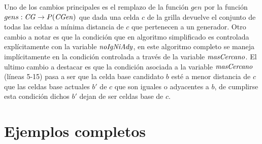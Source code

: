 \newpage
Uno de los cambios principales es el remplazo de la función $gen$ por la
función $gens : \mathit{CG} \rightarrow P(\mathit{CGen})$ que dada una celda $c$ de
la grilla devuelve el conjunto de todas las celdas a mínima distancia de $c$ que pertenecen a
un generador. Otro cambio a notar es que la condición que en algoritmo
simplificado es controlada explícitamente con la variable $\mathit{noIgNiAdy}$, en
este algoritmo completo se maneja implícitamente en la condición controlada
a través de la variable $\mathit{masCercano}$. El ultimo cambio a destacar es que la
condición asociada a la variable $\mathit{masCercano}$ (líneas 5-15) pasa a
ser que la celda base candidato $b$ esté a menor distancia de $c$ que las
celdas base actuales $b'$ de $c$ que son iguales o adyacentes a $b$, de cumplirse esta
condición dichos $b'$ dejan de ser celdas base de $c$.
\newpage

\chapter{Ejemplos completos}
\begingroup
\small

